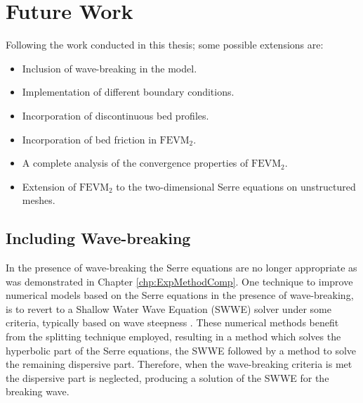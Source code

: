 \section{Future Work}
Following the work conducted in this thesis; some possible extensions are:
\begin{itemize}
	\item Inclusion of wave-breaking in the model.  %
	\item Implementation of different boundary conditions.
	\item Incorporation of discontinuous bed profiles.
	\item Incorporation of bed friction in $\text{FEVM}_2$.
	\item A complete analysis of the convergence properties of $\text{FEVM}_2$.
	\item Extension of $\text{FEVM}_2$ to the two-dimensional Serre equations on unstructured meshes.
\end{itemize}

\subsection{Including Wave-breaking}
In the presence of wave-breaking the Serre equations are no longer appropriate as was demonstrated in Chapter \ref{chp:ExpMethodComp}. One technique to improve numerical models based on the Serre equations in the presence of wave-breaking, is to revert to a Shallow Water Wave Equation (SWWE) solver under some criteria, typically based on wave steepness \cite{Tissier-2011,Filippini-etal-2016-381,DoCarmo-2019-125}. These numerical methods benefit from the splitting technique employed, resulting in a method which solves the hyperbolic part of the Serre equations, the SWWE followed by a method to solve the remaining dispersive part. Therefore, when the wave-breaking criteria is met the dispersive part is neglected, producing a solution of the SWWE for the breaking wave. 

